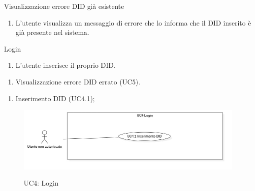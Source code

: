 \begin{usecase}{3}{Visualizzazione errore DID già esistente}\label{uc:registrazione-did-esistente}
  \usecasemain{}
  
  \begin{enumerate}
    \item L'utente visualizza un messaggio di errore che lo informa che il DID inserito è già presente nel sistema.
  \end{enumerate}
\end{usecase}

\begin{usecase}{4}{Login}\label{uc:autenticazione}
  \usecasemain{}
  
  \begin{enumerate}
    \item L'utente inserisce il proprio DID.\@
  \end{enumerate}

  \usecaseext{}
  \begin{enumerate}
    \item Visualizzazione errore DID errato (UC5).
  \end{enumerate}

  \begin{enumerate}
    \item Inserimento DID (UC4.1);
  \end{enumerate}
\end{usecase}

\begin{figure}[!ht] 
  \centering 
  \includegraphics[width=0.9\columnwidth, alt={Caso d'uso relativo all'autenticazione dell'utente}]{immagini/usecase/UC4.jpg}
  \caption{UC4: Login}\label{fig:uc:autenticazione}
\end{figure}


